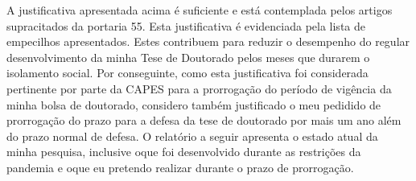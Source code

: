 A justificativa apresentada acima é suficiente e está contemplada pelos artigos supracitados da portaria 55. Esta justificativa é evidenciada pela lista de empecilhos apresentados. Estes contribuem para reduzir o desempenho do regular desenvolvimento da minha Tese de Doutorado pelos meses que durarem o isolamento social. Por conseguinte, como esta
justificativa foi considerada pertinente por parte da CAPES para a prorrogação do período de vigência da minha bolsa
de doutorado, considero também justificado o meu pedidido de prorrogação do prazo para a defesa da tese de doutorado por mais
um ano além do prazo normal de defesa.
O relatório a seguir apresenta o estado atual da minha pesquisa,
inclusive oque foi desenvolvido durante as restrições da pandemia
e oque eu pretendo realizar durante o prazo de prorrogação.

